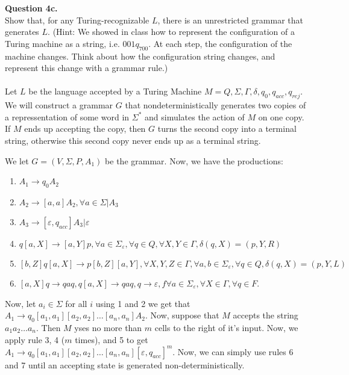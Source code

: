 \documentclass{article}
\renewcommand{\epsilon}{\varepsilon}
\newenvironment{question}[2]
{
    {\large \textbf{Question #1.}}\\
    #2\\\\
}{\newpage}
\begin{document}
\begin{question}
    {4c}
    {Show that, for any Turing-recognizable $L$, there is an unrestricted grammar that generates $L$.
        (Hint: We showed in class how to represent the configuration of a Turing machine as a string, i.e. $001q_700$.
        At each step, the configuration of the machine changes. Think about how the configuration string changes,
        and represent this change with a grammar rule.)}

    Let $L$ be the language accepted by a Turing Machine $M = Q, \Sigma, \Gamma, \delta, q_0, q_{acc}, q_{rej}$. We will construct a grammar $G$ that nondeterministically generates two copies of a repressentation of some word in $\Sigma^*$ and simulates the action of $M$ on one copy. If $M$ ends up accepting the copy,
    then $G$ turns the second copy into a terminal string, otherwise this second copy never ends up as a terminal string.

    We let $G = (V, \Sigma, P, A_1)$ be the grammar. Now, we have the productions:
    \begin{enumerate}
        \item $A_1 \to q_0A_2$
        \item $A_2 \to [a, a]A_2, \forall a \in \Sigma | A_3$
        \item $A_3 \to [\epsilon, q_{acc}]A_3 | \epsilon$
        \item $q[a, X] \to [a, Y]p, \forall a \in \Sigma_\epsilon, \forall q \in Q, \forall X, Y \in \Gamma, \delta(q, X) = (p, Y, R)$
        \item $[b, Z]q[a, X] \to p[b, Z][a, Y], \forall X,Y,Z \in \Gamma, \forall a, b \in \Sigma_\epsilon, \forall q \in Q, \delta(q, X) = (p, Y, L)$
        \item $[a, X]q \to qaq, q[a, X] \to qaq, q \to \epsilon, f \forall a \in \Sigma_\epsilon, \forall X \in \Gamma, \forall q \in F$.
    \end{enumerate}

    Now, let $a_i \in \Sigma$ for all $i$ using 1 and 2 we get that $A_1 \to q_0[a_1, a_1][a_2, a_2]\dots[a_n, a_n]A_2$. Now, suppose that
    $M$ accepts the string $a_1a_2\dots a_n$. Then $M$ yses no more than $m$ cells to the right of it's input. Now, we apply rule 3, 4 ($m$ times), and
    5 to get $A_1 \to  q_0[a_1, a_1][a_2, a_2]\dots[a_n, a_n][\epsilon, q_{acc}]^m$. Now, we can simply use rules 6 and 7 until an accepting state is
    generated non-deterministically.

\end{question}
\end{document}
